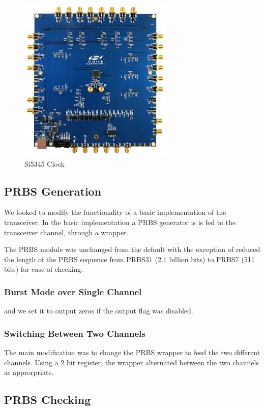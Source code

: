 \begin{figure}[ht]
    \centering
    \includegraphics[width=0.4\linewidth]{img/clock.jpg}
    \caption{Si5345 Clock}%
    \label{fig:clock}
\end{figure}

\subsection{PRBS Generation}%
\label{sub:prbs_generation}

We looked to modify the functionality of a basic implementation of the
transceiver. In the basic implementation a PRBS generator is is fed to the
transceiver channel, through a wrapper. 

The PRBS module was unchanged from the default with the exception of reduced
the length of the PRBS sequence from PRBS31 (2.1 billion bits) to PRBS7 (511
bits) for ease of checking.
\subsubsection{Burst Mode over Single Channel}%
\label{ssub:burst_mode_over_single_channel}
and we set it to output zeros if the output flag was disabled.

\subsubsection{Switching Between Two Channels}%
\label{ssub:switching_between_two_channels}
The main modification was to change the PRBS wrapper to feed the two different
channels. Using a 2 bit register, the wrapper alternated between the two
channels as approrpriate.



\subsection{PRBS Checking}%
\label{sub:prbs_checking}

